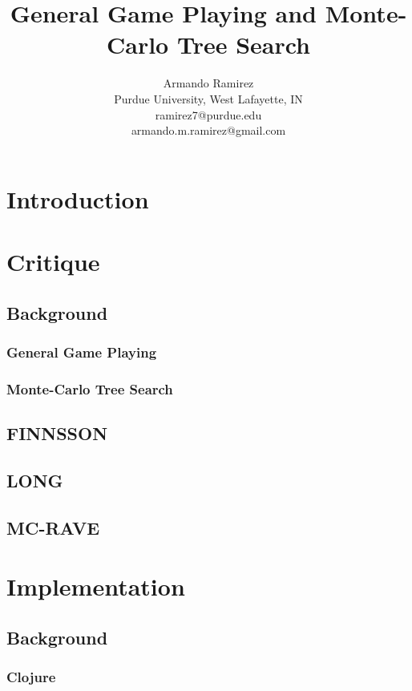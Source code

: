 \documentclass[letterpaper]{article}
\title{General Game Playing and Monte-Carlo Tree Search}
\author{Armando Ramirez \\ Purdue University, West Lafayette, IN \\ ramirez7@purdue.edu \\ armando.m.ramirez@gmail.com}
\begin{document}
\maketitle

\section{Introduction}

\section{Critique}

\subsection{Background}

\subsubsection{General Game Playing}
\cite{StanfordGGP}
\subsubsection{Monte-Carlo Tree Search}

\subsection{FINNSSON}

\subsection{LONG}

\subsection{MC-RAVE}

\section{Implementation}

\subsection{Background}

\subsubsection{Clojure}
\end{document}
